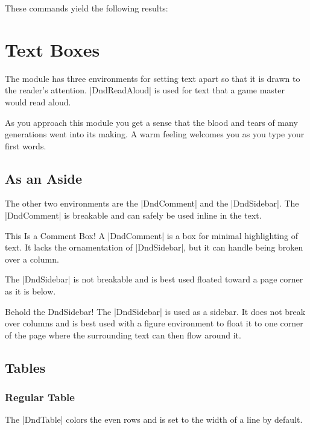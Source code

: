 \documentclass[letterpaper,twocolumn,openany,nodeprecatedcode]{dndbook}
\begin{document}
These commands yield the following results:

\chapter{Text Boxes}

The module has three environments for setting text apart so that it is drawn to the reader's attention. |DndReadAloud| is used for text that a game master would read aloud.

\begin{DndReadAloud}
  As you approach this module you get a sense that the blood and tears of many generations went into its making. A warm feeling welcomes you as you type your first words.
\end{DndReadAloud}

\section{As an Aside}
The other two environments are the |DndComment| and the |DndSidebar|. The |DndComment| is breakable and can safely be used inline in the text.

\begin{DndComment}{This Is a Comment Box!}
  A |DndComment| is a box for minimal highlighting of text. It lacks the ornamentation of |DndSidebar|, but it can handle being broken over a column.
\end{DndComment}

The |DndSidebar| is not breakable and is best used floated toward a page corner as it is below.

\begin{DndSidebar}[float=!b]{Behold the DndSidebar!}
  The |DndSidebar| is used as a sidebar. It does not break over columns and is best used with a figure environment to float it to one corner of the page where the surrounding text can then flow around it.
\end{DndSidebar}

\section{Tables}

\subsection{Regular Table}
The |DndTable| colors the even rows and is set to the width of a line by default.
\end{document}
